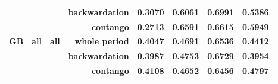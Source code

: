 \documentclass[
  authoryear,
  preprint,
  3p]{elsarticle}
\begin{document}
\begin{longtable}[t]{>{}l>{}l>{}l>{}r>{}r>{}r>{}r>{}r}
\textbf{} & \textbf{} & \textbf{} & \textbf{backwardation} & \textcolor[HTML]{4285f4}{\textbf{0.3070}} & \textcolor[HTML]{4285f4}{\textbf{0.6061}} & \textcolor[HTML]{4285f4}{\textbf{0.6991}} & \textcolor[HTML]{4285f4}{\textbf{0.5386}}\\
\textbf{} & \textbf{} & \textbf{} & \textbf{contango} & \textcolor[HTML]{4285f4}{\textbf{0.2713}} & \textcolor[HTML]{4285f4}{\textbf{0.6591}} & \textcolor[HTML]{4285f4}{\textbf{0.6615}} & \textcolor[HTML]{4285f4}{\textbf{0.5949}}\\
\addlinespace
\textbf{GB} & \textbf{all} & \textbf{all} & \textbf{whole period} & \textcolor[HTML]{4285f4}{\textbf{0.4047}} & \textcolor[HTML]{4285f4}{\textbf{0.4691}} & \textcolor[HTML]{4285f4}{\textbf{0.6536}} & \textcolor[HTML]{4285f4}{\textbf{0.4412}}\\
\textbf{} & \textbf{} & \textbf{} & \textbf{backwardation} & \textcolor[HTML]{4285f4}{\textbf{0.3987}} & \textcolor[HTML]{4285f4}{\textbf{0.4753}} & \textcolor[HTML]{4285f4}{\textbf{0.6729}} & \textcolor[HTML]{4285f4}{\textbf{0.3954}}\\
\textbf{} & \textbf{} & \textbf{} & \textbf{contango} & \textcolor[HTML]{4285f4}{\textbf{0.4108}} & \textcolor[HTML]{4285f4}{\textbf{0.4652}} & \textcolor[HTML]{4285f4}{\textbf{0.6456}} & \textcolor[HTML]{4285f4}{\textbf{0.4797}}\\
\bottomrule

\end{longtable}

\endgroup{}

\newpage

\begingroup\fontsize{7}{9}\selectfont
\end{document}
